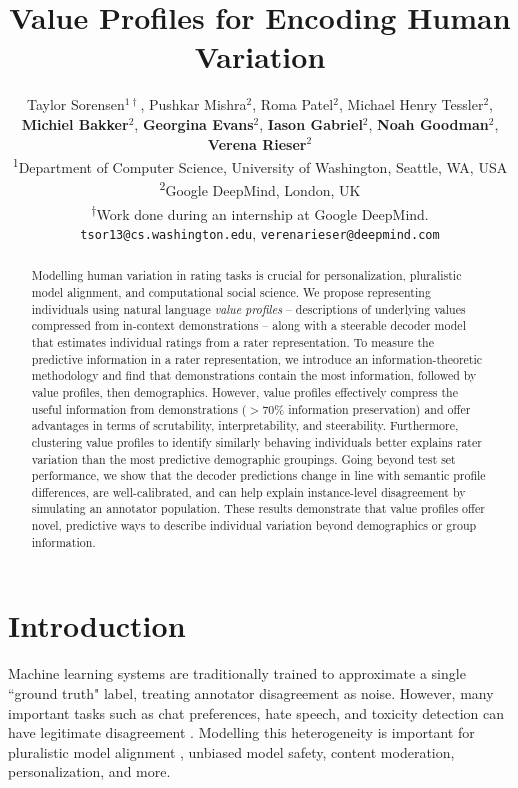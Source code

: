 \documentclass[11pt]{article}
\title{Value Profiles for Encoding Human Variation}
\author{Taylor Sorensen$^{1\dagger}$, Pushkar Mishra$^2$, Roma Patel$^2$, Michael Henry Tessler$^2$, \\
\textbf{Michiel Bakker}$^2$, \textbf{Georgina Evans}$^2$, \textbf{Iason Gabriel}$^2$, \textbf{Noah Goodman}$^2$, \textbf{Verena Rieser}$^2$
\\ \textsuperscript{1}Department of Computer Science, University of Washington, Seattle, WA, USA
\\ \textsuperscript{2}Google DeepMind, London, UK
\\ \textsuperscript{$\dagger$}Work done during an internship at Google DeepMind.
\\ \texttt{tsor13@cs.washington.edu}, \texttt{verenarieser@deepmind.com}
}
\begin{document}

\maketitle

\begin{abstract}
Modelling human variation in rating tasks is crucial for personalization, pluralistic model alignment, and computational social science.
We propose representing individuals using natural language {\em value profiles} -- descriptions of underlying values compressed from in-context demonstrations -- along with a steerable decoder model that estimates individual ratings from a rater representation. To measure the predictive information in a rater representation, we introduce an information-theoretic methodology and find that demonstrations contain the most information, followed by value profiles, then demographics. However, value profiles effectively compress the useful information from demonstrations ($>$70\% information preservation) and offer advantages in terms of scrutability, interpretability, and steerability.
Furthermore, clustering value profiles to identify similarly behaving individuals better explains rater variation than the most predictive demographic groupings.
Going beyond test set performance, we show that the decoder predictions change in line with semantic profile differences, are well-calibrated, and can help explain instance-level disagreement by simulating an annotator population.
These results demonstrate that value profiles offer novel, predictive ways to describe individual variation beyond demographics or group information.
\end{abstract}

\section{Introduction}
\label{sec:introduction}
Machine learning systems are traditionally trained to approximate a single ``ground truth" label, treating annotator disagreement as noise. However, many important tasks such as chat preferences, hate speech, and toxicity detection can have legitimate disagreement \citep{Aroyo_Welty_2015, plank-2022-problem}. Modelling this heterogeneity is important for pluralistic model alignment \citep{sorensen2024roadmappluralisticalignment}, unbiased model safety, content moderation, personalization, and more. 
\end{document}
